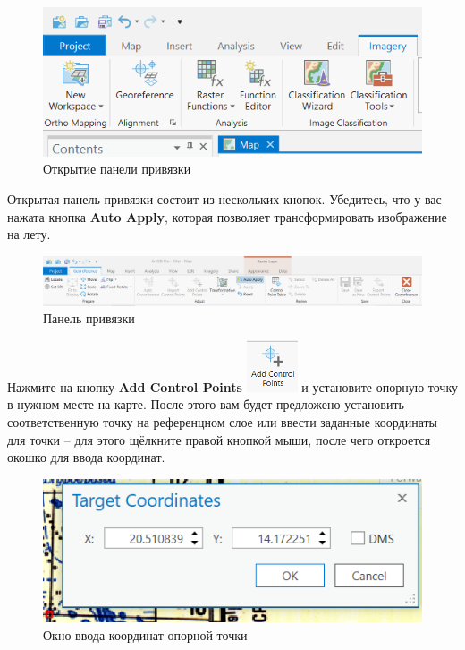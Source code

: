 \documentclass[
  12pt,
]{book}
\begin{document}
\begin{figure}
\centering
\includegraphics{images/Ref02/Arc_georeference.png}
\caption{Открытие панели привязки}
\end{figure}

Открытая панель привязки состоит из нескольких кнопок. Убедитесь, что у вас нажата кнопка \textbf{Auto Apply}, которая позволяет трансформировать изображение на лету.

\begin{figure}
\centering
\includegraphics{images/Ref02/Arc_georef_panel.png}
\caption{Панель привязки}
\end{figure}

Нажмите на кнопку \textbf{Add Control Points} \includegraphics{images/Ref02/Arc_add_control_points.png} и установите опорную точку в нужном месте на карте. После этого вам будет предложено установить соответственную точку на референцном слое или ввести заданные координаты для точки -- для этого щёлкните правой кнопкой мыши, после чего откроется окошко для ввода координат.

\begin{figure}
\centering
\includegraphics{images/Ref02/Arc_target_coords.png}
\caption{Окно ввода координат опорной точки}
\end{figure}
\end{document}
